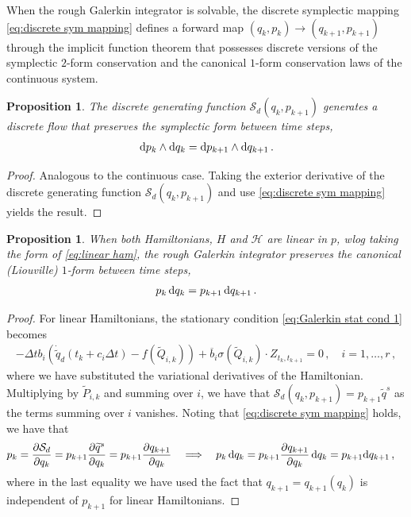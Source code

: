 \documentclass[11pt, oneside]{article}
\numberwithin{equation}{section}
\newtheorem{proposition}[lemma]{Proposition}
\theoremstyle{definition}
\newcommand{\ob}[1]{\overline{#1}}
\newcommand{\wt}[1]{\widetilde{#1}}
\newcommand{\mc}[1]{\mathcal{#1}}
\newcommand{\mcal}[1]{\mc{#1}}
\def\p{{\partial}}
\def\rmd{{\rm d}}
\def\p{\partial}
\begin{document}
When the rough Galerkin integrator is solvable, the discrete symplectic mapping \eqref{eq:discrete sym mapping} defines a forward map $(q_k, p_k) \rightarrow (q_{k+1}, p_{k+1})$ through the implicit function theorem that possesses discrete versions of the symplectic $2$-form conservation and the canonical $1$-form conservation laws of the continuous system.
\begin{proposition}\label{prop:discrete 2form conserv}
    The discrete generating function $\mcal{S}_d(q_k, p_{k+1})$ generates a discrete flow that preserves the symplectic form between time steps,
    \begin{align}\label{eq:discrete 2form conserv}
        \rmd p_k \wedge \rmd q_k = \rmd p_{k+1} \wedge \rmd q_{k+1}\,. 
    \end{align}
\end{proposition}
\begin{proof}
    Analogous to the continuous case. Taking the exterior derivative of the discrete generating function $\mcal{S}_d(q_k, p_{k+1})$ and use \eqref{eq:discrete sym mapping} yields the result.
\end{proof}

\begin{proposition}\label{prop:discrete 1 form CL}
    When both Hamiltonians, $H$ and $\mcal{H}$ are linear in $p$, wlog taking the form of \eqref{eq:linear ham}, the rough Galerkin integrator preserves the canonical (Liouville) $1$-form between time steps,
    \begin{align}
        p_k \,\rmd q_k = p_{k+1}\, \rmd q_{k+1}\,. \label{eq:discrete 1 form CL}
    \end{align}
\end{proposition}
\begin{proof}
    For linear Hamiltonians, the stationary condition \eqref{eq:Galerkin stat cond 1} becomes
    \begin{align*}
        - \Delta t b_i\left(\dot{\wt{q}}_d(t_k + c_i\Delta t) - f(\wt{Q}_{i,k})\right) + \ob{b}_i\sigma(\wt{Q}_{i,k})\cdot Z_{t_k, t_{k+1}} = 0\,,\quad i = 1,\ldots,r\,,
    \end{align*}
    where we have substituted the variational derivatives of the Hamiltonian. Multiplying by $\wt{P}_{i,k}$ and summing over $i$, we have that $\mcal{S}_d(q_k, p_{k+1}) = p_{k+1}\wt{q}^s$ as the terms summing over $i$ vanishes. Noting that \eqref{eq:discrete sym mapping} holds, we have that 
    \begin{align*}
        & p_k = \frac{\p \mcal{S}_d}{\p q_k} = p_{k+1}\frac{\p \wt{q}^s}{\p q_k} = p_{k+1}\frac{\p q_{k+1}}{\p q_k} \quad \Longrightarrow \quad p_k\, \rmd q_k = p_{k+1}\frac{\p q_{k+1}}{\p q_k} \,\rmd q_k = p_{k+1} \rmd q_{k+1}\,,
    \end{align*}
    where in the last equality we have used the fact that $q_{k+1} = q_{k+1}(q_k)$ is independent of $p_{k+1}$ for linear Hamiltonians.
\end{proof}
\end{document}
